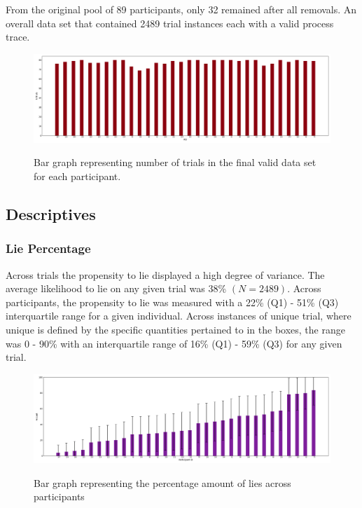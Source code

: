 \documentclass[man, floatsintext]{apa7}
\begin{document}
From the original pool of 89 participants, only 32 remained after all removals. An overall data set that contained 2489 trial instances each with a valid process trace.

\begin{figure}[H]
	\includegraphics[width=\linewidth]{../plots/RESPONSE/NTrialsByPID.png}
	\label{fig:NTrialsByPID}
	\caption{Bar graph representing number of trials in the final valid data set for each participant.}
\end{figure}

\subsection{Descriptives}

\subsubsection{Lie Percentage}

Across trials the propensity to lie displayed a high degree of variance. The average likelihood to lie on any given trial was 38\% $(N = 2489)$. Across participants, the propensity to lie was measured with a 22\% (Q1) - 51\% (Q3) interquartile range for a given individual. Across instances of unique trial, where unique is defined by the specific quantities pertained to in the boxes, the range was 0 - 90\% with an interquartile range of 16\% (Q1) - 59\% (Q3) for any given trial.

\begin{figure}[H]
	\includegraphics[width=\linewidth]{../plots/RESPONSE/PIDPercentLiesPlot.png}
	\label{fig:PIDPercentLiesPlot}
	\caption{Bar graph representing the percentage amount of lies across participants}
\end{figure}
\end{document}
